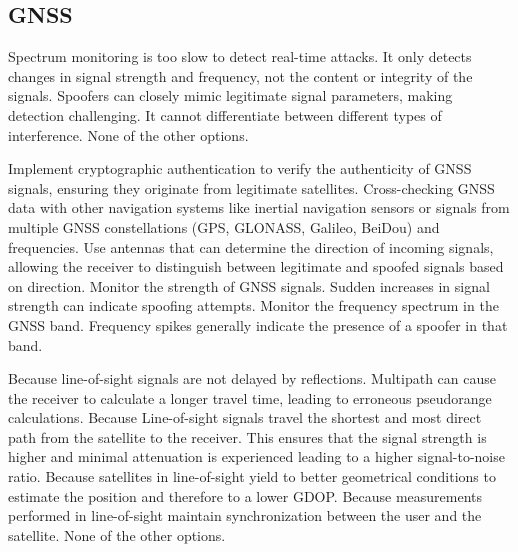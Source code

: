 \subsection{GNSS}

\begin{checkboxes}
    \choice Spectrum monitoring is too slow to detect real-time attacks.
    \CorrectChoice It only detects changes in signal strength and frequency, not the content or integrity of the signals.
    \CorrectChoice Spoofers can closely mimic legitimate signal parameters, making detection challenging.
    \choice It cannot differentiate between different types of interference.
    \choice None of the other options.
\end{checkboxes}


\begin{checkboxes}
    \choice Implement cryptographic authentication to verify the authenticity of GNSS signals, ensuring they originate from legitimate satellites.
    \choice Cross-checking GNSS data with other navigation systems like inertial navigation sensors or signals from multiple GNSS constellations (GPS, GLONASS, Galileo, BeiDou) and frequencies.
    \choice Use antennas that can determine the direction of incoming signals, allowing the receiver to distinguish between legitimate and spoofed signals based on direction.
    \choice Monitor the strength of GNSS signals. Sudden increases in signal strength can indicate spoofing attempts.
    \CorrectChoice Monitor the frequency spectrum in the GNSS band. Frequency spikes generally indicate the presence of a spoofer in that band.
\end{checkboxes}


\begin{checkboxes}
    \CorrectChoice Because line-of-sight signals are not delayed by reflections. Multipath can cause the receiver to calculate a longer travel time, leading to erroneous pseudorange calculations.
    \CorrectChoice Because Line-of-sight signals travel the shortest and most direct path from the satellite to the receiver. This ensures that the signal strength is higher and minimal attenuation is experienced leading to a higher signal-to-noise ratio.
    \choice Because satellites in line-of-sight yield to better geometrical conditions to estimate the position and therefore to a lower GDOP.
    \choice Because measurements performed in line-of-sight maintain synchronization between the user and the satellite.
    \choice None of the other options.
\end{checkboxes}


